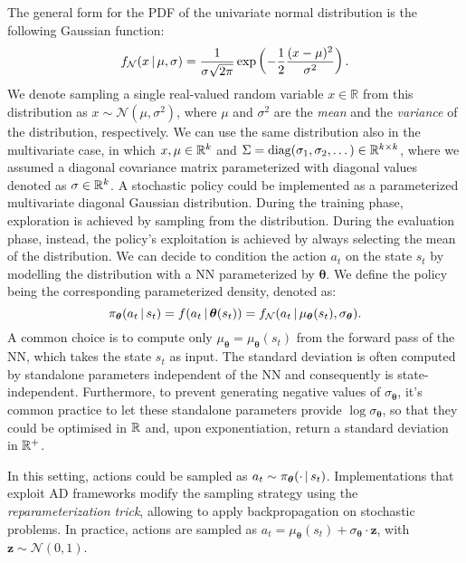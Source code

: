 \begin{example*}
%
\label{example:diagonal_gaussian_policy}
The general form for the \ac{PDF} of the univariate normal distribution is the following Gaussian function:
%
\begin{equation}
    \label{eq:gaussian_function}
    f_{\mathcal{N}}(x \operatorname{\mid} \mu, \sigma)
    = \frac{1}{\sigma \sqrt{2\pi}} \exp \left( -\frac{1}{2}\frac{(x - \mu)^2}{\sigma^2} \right).
\end{equation}
%
We denote sampling a single real-valued random variable $x \in \mathbb{R}$ from this distribution as $x \sim \mathcal{N}(\mu, \sigma^2)$, where $\mu$ and $\sigma^2$ are the \emph{mean} and the \emph{variance} of the distribution, respectively.
We can use the same distribution also in the multivariate case, in which $x, \mu \in \mathbb{R}^k$ and $\Sigma = \operatorname{diag}(\sigma_1, \sigma_2, \dots) \in \mathbb{R}^{k\times k}$, where we assumed a diagonal covariance matrix parameterized with diagonal values denoted as $\sigma \in \mathbb{R}^k$.
A stochastic policy could be implemented as a parameterized multivariate diagonal Gaussian distribution.
During the training phase, exploration is achieved by sampling from the distribution.
During the evaluation phase, instead, the policy's exploitation is achieved by always selecting the mean of the distribution.
We can decide to condition the action $a_t$ on the state $s_t$ by modelling the distribution with a \ac{NN} parameterized by $\boldsymbol{\theta}$.
We define the policy being the corresponding parameterized density, denoted as:
%
\begin{equation*}
    \pi_{\boldsymbol{\theta}}(a_t \operatorname{\mid} s_t) = 
    f(a_t \operatorname{\mid} \boldsymbol{\theta}(s_t)) = f_{\mathcal{N}}(a_t \operatorname{\mid} \mu_{\boldsymbol{\theta}}(s_t), \sigma_{\boldsymbol{\theta}})
    .
\end{equation*}
%
A common choice is to compute only $\mu_{\boldsymbol{\theta}} =\mu_{\boldsymbol{\theta}}(s_t) $ from the forward pass of the \ac{NN}, which takes the state $s_t$ as input.
The standard deviation is often computed by standalone parameters independent of the \ac{NN} and consequently is state-independent.
Furthermore, to prevent generating negative values of $\sigma_{\boldsymbol{\theta}}$, it's common practice to let these standalone parameters provide $\log \sigma_{\boldsymbol{\theta}}$, so that they could be optimised in $\mathbb{R}$ and, upon exponentiation, return a standard deviation in $\mathbb{R}^+$.

In this setting, actions could be sampled as $a_t \sim \pi_{\boldsymbol{\theta}}(\cdot \operatorname{\mid} s_t)$.
Implementations that exploit \ac{AD} frameworks modify the sampling strategy using the \emph{reparameterization trick}, allowing to apply backpropagation on stochastic problems.
In practice, actions are sampled as $a_t =
\mu_{\boldsymbol{\theta}}(s_t) + \sigma_{\boldsymbol{\theta}} \cdot \boldsymbol{z}$, with $\boldsymbol{z} \sim \mathcal{N}(0, 1)$.
%
\end{example*}

